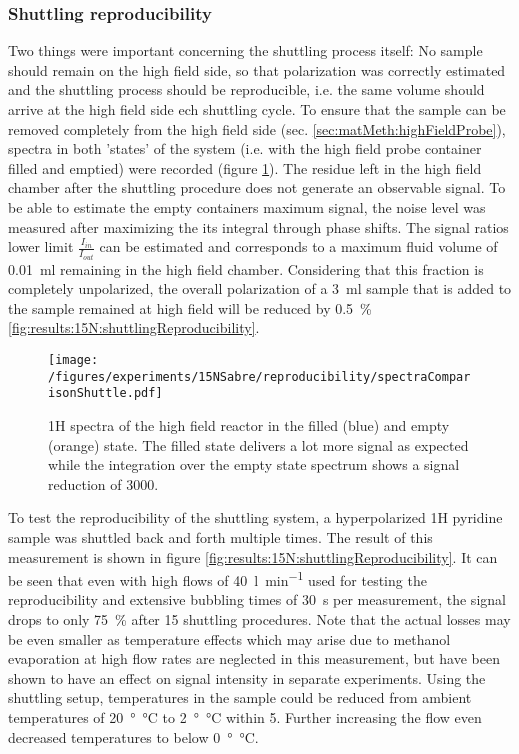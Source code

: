         \subsubsection{Shuttling reproducibility}
            \label{results:15N:shuttlingReproducibility}
            Two things were important concerning the shuttling process itself: No sample should remain on the high field side, so that polarization was correctly estimated and the shuttling process should be reproducible, i.e. the same volume should arrive at the high field side ech shuttling cycle.
            To ensure that the sample can be removed completely from the high field side (sec. \ref{sec:matMeth:highFieldProbe}), spectra in both 'states' of the system (i.e. with the high field probe container filled and emptied) were recorded (figure \ref{fig:results:15N:shuttlingRemoval}). The residue left in the high field chamber after the shuttling procedure does not generate an observable signal. To be able to estimate the empty containers maximum signal, the noise level was measured after maximizing the its integral through phase shifts. The signal ratios lower limit $\frac{I_{in}}{I_{out}}$ can be estimated and corresponds to a maximum fluid volume of \SI{0.01}{ml} remaining in the high field chamber. Considering that this fraction is completely unpolarized, the overall polarization of a \SI{3}{ml} sample that is added to the sample remained at high field  will be reduced by \SI{0.5}{\percent} \ref{fig:results:15N:shuttlingReproducibility}.
            \begin{figure}
                \centering
                \texttt{[image: /figures/experiments/15NSabre/reproducibility/spectraComparisonShuttle.pdf]}
                \caption[High field removal efficiency]{1H spectra of the high field reactor in the filled (blue) and empty (orange) state. The filled state delivers a lot more signal as expected while the integration over the empty state spectrum shows a signal reduction of 3000.}
                \label{fig:results:15N:shuttlingRemoval}
            \end{figure}
            To test the reproducibility of the shuttling system, a hyperpolarized 1H pyridine sample was shuttled back and forth multiple times. The result of this measurement is shown in figure \ref{fig:results:15N:shuttlingReproducibility}. It can be seen that even with high flows of \SI{40}{\litre\per\minute} used for testing the reproducibility and extensive bubbling times of \SI{30}{\second} per measurement, the signal drops to only \SI{75}{\percent} after 15 shuttling procedures. Note that the actual losses may be even smaller as temperature effects which may arise due to methanol evaporation at high flow rates are neglected in this measurement, but have been shown to have an effect on signal intensity in separate experiments. Using the shuttling setup, temperatures in the sample could be reduced from ambient temperatures of \SI{20}{\degree\celsius} to \SI{2}{\degree\celsius} within \SI{5}{\min}. Further increasing the flow even decreased temperatures to below \SI{0}{\degree\celsius}.
